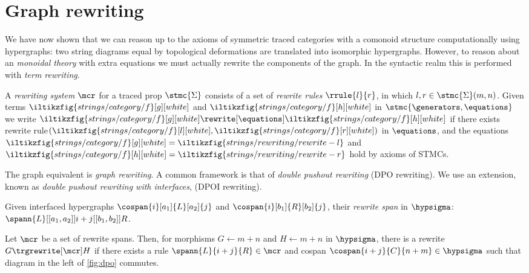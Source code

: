 \section{Graph rewriting}

We have now shown that we can reason up to the axioms of symmetric traced
categories with a comonoid structure computationally using hypergraphs: two
string diagrams equal by topological deformations are translated into isomorphic
hypergraphs.
However, to reason about an \emph{monoidal theory} with extra equations we must
actually rewrite the components of the graph.
In the syntactic realm this is performed with \emph{term rewriting}.

\begin{definition}\label{def:term-rewriting}
    A \emph{rewriting system} \(\mcr\) for a traced prop \(\stmc{\Sigma}\)
    consists of a set of \emph{rewrite rules} \(\rrule{l}{r}\), in which
    \(l, r \in \stmc{\Sigma}(m,n)\).
    Given terms \(
        \iltikzfig{strings/category/f}[g][white]
    \) and \(
        \iltikzfig{strings/category/f}[h][white]
    \) in \(\stmc{\generators,\equations}\) we write \(
        \iltikzfig{strings/category/f}[g][white]
        \rewrite[\equations]
        \iltikzfig{strings/category/f}[h][white]
    \) if there exists rewrite rule\((
        \iltikzfig{strings/category/f}[l][white],
        \iltikzfig{strings/category/f}[r][white]
    )\) in \(\equations\), and the equations \(
        \iltikzfig{strings/category/f}[g][white]
        =
        \iltikzfig{strings/rewriting/rewrite-l}
    \) and \(
        \iltikzfig{strings/category/f}[h][white]
        =
        \iltikzfig{strings/rewriting/rewrite-r}
    \) hold by axioms of STMCs.
\end{definition}

The graph equivalent is \emph{graph rewriting}.
A common framework is that of \emph{double pushout rewriting} (DPO rewriting).
We use an extension, known as \emph{double pushout rewriting with interfaces},
(DPOI rewriting).

\begin{definition}
    Given interfaced hypergraphs \(
        \cospan{i}[a_1]{L}[a_2]{j}
    \) and \(
        \cospan{i}[b_1]{R}[b_2]{j}
    \), their \emph{rewrite span} in \(\hypsigma\): \(
        \spann{L}[[a_1,a_2]]{i+j}[[b_1,b_2]]{R}
    \).
\end{definition}

\begin{definition}\label{def:dpo}
    Let \(\mcr\) be a set of rewrite spans.
    Then, for morphisms \(G \leftarrow m+n\) and \(H \leftarrow m+n\) in
    \(\hypsigma\), there is a rewrite \(G \trgrewrite[\mcr] H\) if there
    exists a rule \(
        \spann{L}{i+j}{R} \in \mcr
    \) and cospan \(
        \cospan{i+j}{C}{n+m} \in \hypsigma
    \) such that diagram in the left of \cref{fig:dpo} commutes.
\end{definition}

